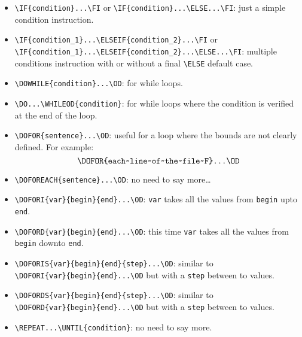 \documentclass{article}
\begin{document}
\begin{itemize}
\item 
	\verb!\IF{condition}...\FI! or \verb!\IF{condition}...\ELSE...\FI!: just a simple condition instruction.
\item 
	\verb!\IF{condition_1}...\ELSEIF{condition_2}...\FI! or \\
	\verb!\IF{condition_1}...\ELSEIF{condition_2}...\ELSE...\FI!: multiple 
	conditions instruction with or without a final \verb!\ELSE! default case.
\item 
	\verb!\DOWHILE{condition}...\OD!: for while loops.
\item 
	\verb!\DO...\WHILEOD{condition}!: for while loops where the condition is verified at the end of the loop.
\item 
	\verb!\DOFOR{sentence}...\OD!: useful for a loop where the bounds are not clearly defined. For example:
	$$\verb!\DOFOR{each~line~of~the~file~F}...\OD!$$ 
\item 
	\verb!\DOFOREACH{sentence}...\OD!: no need to say more\ldots 
\item 
	\verb!\DOFORI{var}{begin}{end}...\OD!: \verb!var! takes all the values from \verb!begin! upto \verb!end!.
\item
	\verb!\DOFORD{var}{begin}{end}...\OD!: this time \verb!var! takes all the values from \verb!begin! downto \verb!end!.
\item
	\verb!\DOFORIS{var}{begin}{end}{step}...\OD!: similar to\\ \verb!\DOFORI{var}{begin}{end}...\OD! but with a \verb!step! between to values.
\item
	\verb!\DOFORDS{var}{begin}{end}{step}...\OD!: similar to\\ \verb!\DOFORD{var}{begin}{end}...\OD! but with a \verb!step! between to values.
\item
	\verb!\REPEAT...\UNTIL{condition}!: no need to say more.
\end{itemize}
\end{document}
